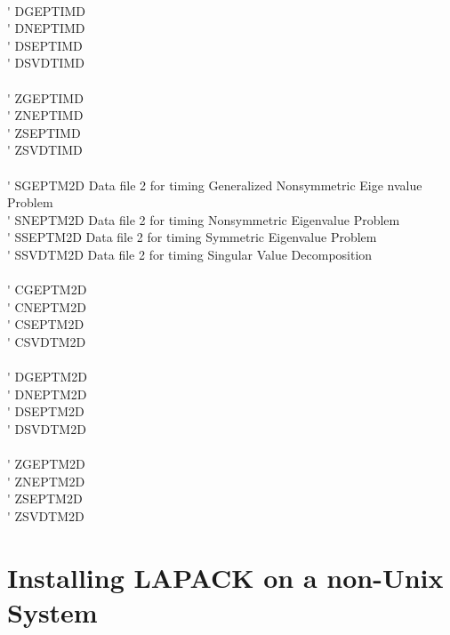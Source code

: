 \begin{tabbing}
\vspace{0.1ex} \\
 \> \titem \' \> DGEPTIMD \> \\
 \> \titem \' \> DNEPTIMD \> \\
 \> \titem \' \> DSEPTIMD \> \\
 \> \titem \' \> DSVDTIMD \> \\
\vspace{0.1ex} \\
 \> \titem \' \> ZGEPTIMD \> \\
 \> \titem \' \> ZNEPTIMD \> \\
 \> \titem \' \> ZSEPTIMD \> \\
 \> \titem \' \> ZSVDTIMD \> \\
\vspace{0.1ex} \\
 \> \titem \' \> SGEPTM2D\> Data file 2 for timing Generalized Nonsymmetric Eige
nvalue Problem \\
 \> \titem \' \> SNEPTM2D\> Data file 2 for timing Nonsymmetric Eigenvalue Problem \\
 \> \titem \' \> SSEPTM2D\> Data file 2 for timing Symmetric Eigenvalue Problem \\
 \> \titem \' \> SSVDTM2D\> Data file 2 for timing Singular Value Decomposition \\
\vspace{0.1ex} \\
 \> \titem \' \> CGEPTM2D \> \\
 \> \titem \' \> CNEPTM2D \> \\
 \> \titem \' \> CSEPTM2D \> \\
 \> \titem \' \> CSVDTM2D \> \\
\vspace{0.1ex} \\
 \> \titem \' \> DGEPTM2D \> \\
 \> \titem \' \> DNEPTM2D \> \\
 \> \titem \' \> DSEPTM2D \> \\
 \> \titem \' \> DSVDTM2D \> \\
\vspace{0.1ex} \\
 \> \titem \' \> ZGEPTM2D \> \\
 \> \titem \' \> ZNEPTM2D \> \\
 \> \titem \' \> ZSEPTM2D \> \\
 \> \titem \' \> ZSVDTM2D \>
\end{tabbing}

\section{Installing LAPACK on a non-Unix System}

